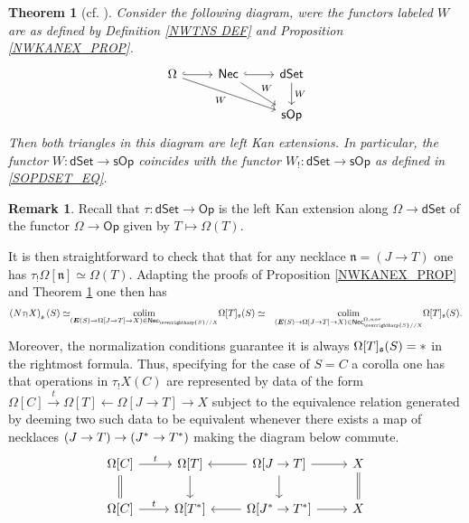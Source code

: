 \documentclass[a4paper,10pt
,draft
]{article}%
\numberwithin{equation}{section}
\numberwithin{figure}{section}
\newtheorem{theorem}[equation]{Theorem}%
\theoremstyle{definition} %
\newtheorem{remark}[equation]{Remark}%
\newcommand{\vect}[1]{\text{\overrightharp{\ensuremath{#1}}}}
\DeclareMathOperator{\colim}{colim}%
\newcommand{\1}{\ensuremath{\mathbbm 1}}%
\begin{document}
\begin{theorem}[{cf. \cite[Thm. 1.3]{DS11}}]
	\label{KANEXTCHAR THM}
	Consider the following diagram,
	were the functors labeled $W$ 
	are as defined by Definition \ref{NWTNS DEF}
	and Proposition \ref{NWKANEX_PROP}.
\begin{equation}
\begin{tikzcd}
	\Omega \ar[hookrightarrow]{r}
	\ar{rrd}[swap]{W} 
&
	\mathsf{Nec}
	\ar[hookrightarrow]{r}
	\ar{rd}{W}
&
	\mathsf{dSet}
	\ar{d}{W}
\\
&&
	\mathsf{sOp} 
\end{tikzcd}
\end{equation}
Then both triangles in this diagram are left Kan extensions.
%
In particular, the functor
$W \colon \mathsf{dSet} \to \mathsf{sOp}$
coincides with the functor
$W_! \colon \mathsf{dSet} \to \mathsf{sOp}$
as defined in \eqref{SOPDSET_EQ}.
\end{theorem}



\begin{remark}\label{TAUFUNEX REM}
	Recall that
	$\tau \colon \mathsf{dSet} \to \mathsf{Op}$
	is the left Kan extension along
	$\Omega \to \mathsf{dSet}$
	of the functor
	$\Omega \to \mathsf{Op}$
	given by $T \mapsto \Omega(T)$.
	
	It is then straightforward to check that
	that for any necklace
	$\mathfrak{n} = (J \to T)$
	one has 
	$\tau_! \Omega[\mathfrak{n}] \simeq \Omega(T)$.
	Adapting the proofs of 
	Proposition \ref{NWKANEX_PROP} and
	Theorem \ref{KANEXTCHAR THM} one then has
\begin{equation}
\begin{aligned}
	\left(N \tau_!X\right)_{\mathfrak{s}}(S) 
	\simeq &
\underset{(\boldsymbol{E}(S) \to 
	\Omega[J \to T] \to X)
	\in \mathsf{Nec}_{\vect{S}//X}}{\colim}
	\Omega[T]_{\mathfrak{s}}(S)
	\simeq &
\underset{(\boldsymbol{E}(S) \to 
	\Omega[J \to T] \to X)
	\in \mathsf{Nec}^{\Omega,nor}_{\vect{S}//X}}{\colim}
	\Omega[T]_{\mathfrak{s}}(S).
\end{aligned}
\end{equation}
Moreover, the normalization conditions guarantee
it is always 
$\Omega[T]_{\mathfrak{s}}(S) = \**$
in the rightmost formula.
Thus, specifying for the case of
$S=C$ a corolla one has that operations in
$\tau_!X(C)$
are represented by 
data of the form
$
	\Omega[C]
	\xrightarrow{t}
	\Omega[T]
	\leftarrow
	\Omega[J \to T]
	\to X
$
subject to the equivalence relation
generated by deeming two such data to be equivalent whenever there exists a map of necklaces
$(J \to T) \to (J^{\**} \to T^{\**})$
making the diagram below commute.
\[
\begin{tikzcd}
	\Omega[C] \ar{r}{t} \ar[equal]{d} &
	\Omega[T] \ar{d} &
	\Omega[J \to T] \ar{l} \ar{r} \ar{d} &
	X \ar[equal]{d}
\\
	\Omega[C] \ar{r}{t} &
	\Omega[T^{\**}] &
	\Omega[J^{\**} \to T^{\**}] \ar{l} \ar{r} &
	X
\end{tikzcd}
\]
\end{remark}
\end{document}
